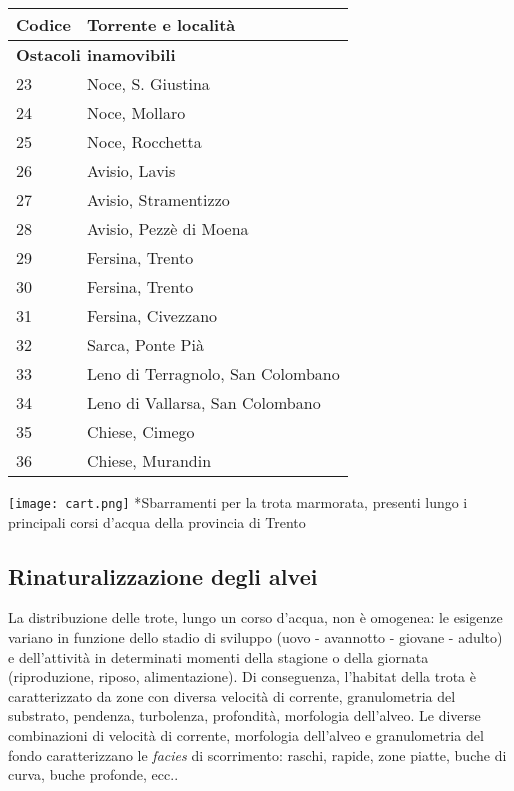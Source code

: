 \documentclass[10pt,twoside,openany,x11names,svgnames,italian,a5paper,dvipsnames,table]{memoir}
\begin{document}
\begin{table}[!htb]
\begin{minipage}[t]{.5\linewidth}
{        \begin{tabular}[t]{ll}
            \textbf{Codice} & \textbf{Torrente e località} \\
            \toprule
    \multicolumn{2}{l}{\textbf{Ostacoli inamovibili}} \\        
            23 & Noce, S. Giustina \\
            24 & Noce, Mollaro \\
            25 & Noce, Rocchetta \\
            26 & Avisio, Lavis \\
            27 & Avisio, Stramentizzo \\
            28 & Avisio, Pezzè di Moena \\
            29 & Fersina, Trento \\
            30 & Fersina, Trento \\
            31 & Fersina, Civezzano \\
            32 & Sarca, Ponte Pià \\
            33 & Leno di Terragnolo, San Colombano \\
            34 & Leno di Vallarsa, San Colombano \\
            35 & Chiese, Cimego \\
            36 & Chiese, Murandin \\
            \bottomrule
        \end{tabular}

      }
      
    \end{minipage} 
\end{table}

\begin{sidewaysfigure}
\centering
\texttt{[image: cart.png]}
*{Sbarramenti per la trota marmorata, presenti lungo i principali corsi d’acqua della provincia di Trento}
\label{fig:sbarr}
\end{sidewaysfigure}

\newpage
\subsection{Rinaturalizzazione degli alvei}
La distribuzione delle trote, lungo un corso d'acqua, non è omogenea: le esigenze variano in funzione dello stadio di sviluppo (uovo - avannotto - giovane - adulto) e dell'attività in determinati momenti della stagione o della giornata (riproduzione, riposo, alimentazione). Di conseguenza, l’habitat della trota è caratterizzato da zone con diversa velocità di corrente, granulometria del substrato, pendenza, turbolenza, profondità, morfologia dell’alveo. Le diverse combinazioni di velocità di corrente, morfologia dell'alveo e granulometria del fondo caratterizzano le \emph{facies} di scorrimento: raschi, rapide, zone piatte, buche di curva, buche profonde, ecc..
\end{document}
